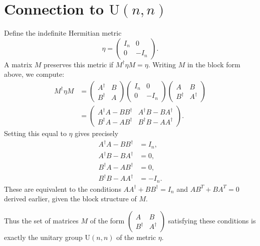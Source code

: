 \documentclass[aps,pre,twocolumn,floatfix,superscriptaddress,10pt]{revtex4}
\begin{document}
\section{Connection to $\mathrm{U}(n,n)$}

Define the indefinite Hermitian metric 
\begin{equation}
\eta = 
\begin{pmatrix}
I_n & 0 \\ 
0 & -I_n%
\end{pmatrix}%
.
\end{equation}
A matrix $M$ preserves this metric if $M^\dagger \eta M = \eta$. Writing $M$
in the block form above, we compute: 
\begin{align}
M^\dagger \eta M &= 
\begin{pmatrix}
A^\dagger & B \\ 
B^\dagger & A%
\end{pmatrix}
\begin{pmatrix}
I_n & 0 \\ 
0 & -I_n%
\end{pmatrix}
\begin{pmatrix}
A & B \\ 
B^\dagger & A^\dagger%
\end{pmatrix}
\\
&= 
\begin{pmatrix}
A^\dagger A - B B^\dagger & A^\dagger B - B A^\dagger \\ 
B^\dagger A - A B^\dagger & B^\dagger B - A A^\dagger%
\end{pmatrix}%
.
\end{align}
Setting this equal to $\eta$ gives precisely 
\begin{align}
A^\dagger A - B B^\dagger &= I_n, \\
A^\dagger B - B A^\dagger &= 0, \\
B^\dagger A - A B^\dagger &= 0, \\
B^\dagger B - A A^\dagger &= -I_n.
\end{align}
These are equivalent to the conditions $A A^\dagger + B B^\dagger = I_n$ and 
$A B^T + B A^T = 0$ derived earlier, given the block structure of $M$.

Thus the set of matrices $M$ of the form $%
\begin{pmatrix}
A & B \\ 
B^\dagger & A^\dagger%
\end{pmatrix}%
$ satisfying these conditions is exactly the unitary group $\mathrm{U}(n,n)$
of the metric $\eta$.
\end{document}
